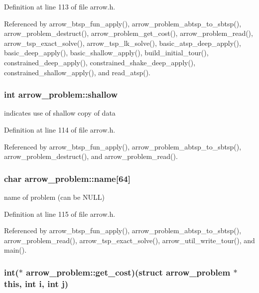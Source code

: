 Definition at line 113 of file arrow.h.

Referenced by arrow\_\-btsp\_\-fun\_\-apply(), arrow\_\-problem\_\-abtsp\_\-to\_\-sbtsp(), arrow\_\-problem\_\-destruct(), arrow\_\-problem\_\-get\_\-cost(), arrow\_\-problem\_\-read(), arrow\_\-tsp\_\-exact\_\-solve(), arrow\_\-tsp\_\-lk\_\-solve(), basic\_\-atsp\_\-deep\_\-apply(), basic\_\-deep\_\-apply(), basic\_\-shallow\_\-apply(), build\_\-initial\_\-tour(), constrained\_\-deep\_\-apply(), constrained\_\-shake\_\-deep\_\-apply(), constrained\_\-shallow\_\-apply(), and read\_\-atsp().\hypertarget{structarrow__problem_8c3f4f7794c1430440658d69151b296d}{
\subsubsection{\setlength{\rightskip}{0pt plus 5cm}int {\bf arrow\_\-problem::shallow}}}
\label{structarrow__problem_8c3f4f7794c1430440658d69151b296d}


indicates use of shallow copy of data 

Definition at line 114 of file arrow.h.

Referenced by arrow\_\-btsp\_\-fun\_\-apply(), arrow\_\-problem\_\-abtsp\_\-to\_\-sbtsp(), arrow\_\-problem\_\-destruct(), and arrow\_\-problem\_\-read().\hypertarget{structarrow__problem_49462b24d5f3de4c973bfcf868d7b606}{
\subsubsection{\setlength{\rightskip}{0pt plus 5cm}char {\bf arrow\_\-problem::name}\mbox{[}64\mbox{]}}}
\label{structarrow__problem_49462b24d5f3de4c973bfcf868d7b606}


name of problem (can be NULL) 

Definition at line 115 of file arrow.h.

Referenced by arrow\_\-btsp\_\-fun\_\-apply(), arrow\_\-problem\_\-abtsp\_\-to\_\-sbtsp(), arrow\_\-problem\_\-read(), arrow\_\-tsp\_\-exact\_\-solve(), arrow\_\-util\_\-write\_\-tour(), and main().\hypertarget{structarrow__problem_4f1f4c9ef90f240b248e8f39360da769}{
\subsubsection{\setlength{\rightskip}{0pt plus 5cm}int($\ast$ {\bf arrow\_\-problem::get\_\-cost})(struct {\bf arrow\_\-problem} $\ast$this, int i, int j)}}
\label{structarrow__problem_4f1f4c9ef90f240b248e8f39360da769}


